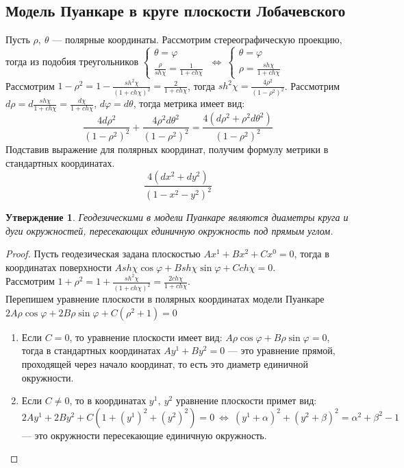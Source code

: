 \documentclass[12pt]{article}
\theoremstyle{plain}
\newtheorem{subtheorem}{Утверждение}[section]
\renewcommand{\phi}{\varphi}
\begin{document}
    \subsection{Модель Пуанкаре в круге плоскости Лобачевского}
    Пусть $\rho, \ \theta$ --- полярные координаты. Рассмотрим стереографическую проекцию, тогда из подобия треугольников $\begin{cases}
        \theta=\phi\\
        \frac{\rho}{sh\chi}=\frac{1}{1+ch\chi}
    \end{cases} \ \Longleftrightarrow \ \begin{cases}
        \theta=\phi\\
        \rho=\frac{sh\chi}{1+ch\chi}
    \end{cases}$\\
    Рассмотрим $1-\rho^2=1-\frac{sh^2\chi}{(1+ch\chi)^2}=\frac{2}{1+ch\chi}$, тогда $sh^2\chi=\frac{4\rho^2}{(1-\rho^2)^2}$.
    Рассмотрим $d\rho=d\frac{sh\chi}{1+ch\chi}=\frac{d\chi}{1+ch\chi}$, $d\phi=d\theta$, тогда метрика имеет вид: $$\frac{4d\rho^2}{(1-\rho^2)^2}+\frac{4\rho^2d\theta^2}{(1-\rho^2)^2}=\frac{4(d\rho^2+\rho^2d\theta^2)}{(1-\rho^2)^2}$$
    Подставив выражение для полярных координат, получим формулу метрики в стандартных координатах.
    $$\frac{4(dx^2+dy^2)}{(1-x^2-y^2)^2}$$
    \begin{subtheorem}
        Геодезическими в модели Пуанкаре являются диаметры круга и дуги окружностей, пересекающих единичную окружность под прямым углом.
    \end{subtheorem}
    \begin{proof}
        Пусть геодезическая задана плоскостью $Ax^1+Bx^2+Cx^0=0$, тогда в координатах поверхности $Ash\chi\cos\phi+Bsh\chi\sin\phi+Cch\chi=0$.\\
        Рассмотрим $1+\rho^2=1+\frac{sh^2\chi}{(1+ch\chi)^2}=\frac{2ch\chi}{1+ch\chi}$.\\
        Перепишем уравнение плоскости в полярных координатах модели Пуанкаре $2A\rho\cos\phi+2B\rho\sin\phi+C(\rho^2+1)=0$
        \begin{enumerate}
            \item Если $C=0$, то уравнение плоскости имеет вид: $A\rho\cos\phi+B\rho\sin\phi=0$, тогда в стандартных координатах $Ay^1+By^2=0$ --- это уравнение прямой, проходящей через начало координат, то есть это диаметр единичной окружности.
            \item Если $C\neq0$, то в координатах $y^1, \ y^2$ уравнение плоскости примет вид: $2Ay^1+2By^2+C(1+(y^1)^2+(y^2)^2)=0 \ \Longleftrightarrow \ (y^1+\alpha)^2+(y^2+\beta)^2=\alpha^2+\beta^2-1$ --- это окружности пересекающие единичную окружность.
        \end{enumerate}
    \end{proof}
\end{document}
